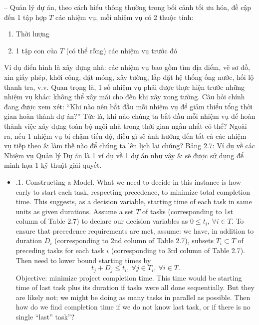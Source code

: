 \documentclass{article}
\begin{document}
\begin{itemize}
\begin{itemize}
        -- Quản lý dự án, theo cách hiểu thông thường trong bối cảnh tối ưu hóa, đề cập đến 1 tập hợp $T$ các nhiệm vụ, mỗi nhiệm vụ có 2 thuộc tính:
        \begin{enumerate}
            \item Thời lượng
            \item 1 tập con của $T$ (có thể rỗng) các nhiệm vụ trước đó
        \end{enumerate}
        Ví dụ điển hình là xây dựng nhà: các nhiệm vụ bao gồm tìm địa điểm, vẽ sơ đồ, xin giấy phép, khởi công, đặt móng, xây tường, lắp đặt hệ thống ống nước, hối lộ thanh tra, v.v. Quan trọng là, 1 số nhiệm vụ phải được thực hiện trước những nhiệm vụ khác: không thể xây mái cho đến khi xây xong tường. Câu hỏi chính đang được xem xét: ``Khi nào nên bắt đầu mỗi nhiệm vụ để giảm thiểu tổng thời gian hoàn thành dự án?'' Tức là, khi nào chúng ta bắt đầu mỗi nhiệm vụ để hoàn thành việc xây dựng toàn bộ ngôi nhà trong thời gian ngắn nhất có thể? Ngoài ra, nếu 1 nhiệm vụ bị chậm tiến độ, điều gì sẽ ảnh hưởng đến tất cả các nhiệm vụ tiếp theo \& làm thế nào để chúng ta lên lịch lại chúng? {\sf Bảng 2.7: Ví dụ về các Nhiệm vụ Quản lý Dự án} là 1 ví dụ về 1 dự án như vậy \& sẽ được sử dụng để minh họa 1 kỹ thuật giải quyết.
        \begin{itemize}
            \item {.1. Constructing a Model.} What we need to decide in this instance is how early to start each task, respecting precedence, to minimize total completion time. This suggests, as a decision variable, starting time of each task in same units as given durations. Assume a set $T$ of tasks (corresponding to 1st column of Table 2.7) to declare our decision variables as $0\le t_i$, $\forall i\in T$. To ensure that precedence requirements are met, assume: we have, in addition to duration $D_i$ (corresponding to 2nd column of Table 2.7), subsets $T_i\subset T$ of preceding tasks for each task $i$ (corresponding to 3rd column of Table 2.7). Then need to lower bound starting times by
            \begin{equation*}
                t_j + D_j\le t_i,\ \forall j\in T_i,\ \forall i\in T.
            \end{equation*}
            Objective: minimize project completion time. This time would be starting time of last task plus its duration if tasks were all done sequentially. But they are likely not; we might be doing as many tasks in parallel as possible. Then how do we find completion time if we do not know last task, or if there is no single ``last'' task''?


\end{itemize}
\end{itemize}
\end{itemize}
\end{document}
